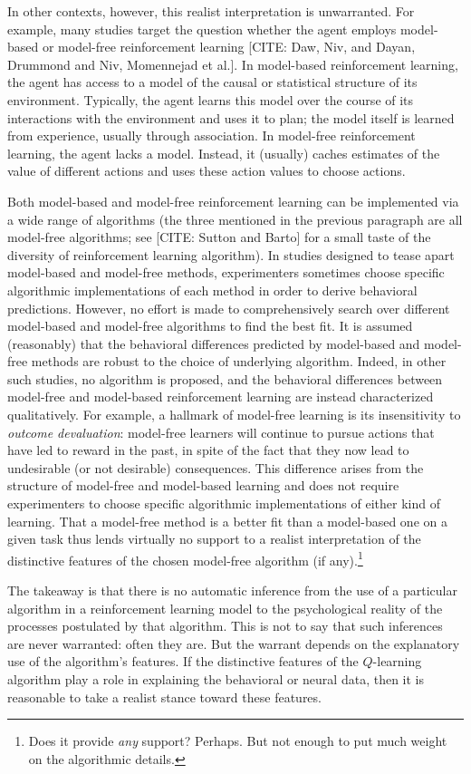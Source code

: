 In other contexts, however, this realist interpretation is unwarranted.
For example, many studies target the question whether the agent employs model-based or model-free reinforcement learning [CITE: Daw, Niv, and Dayan, Drummond and Niv, Momennejad et al.].
In model-based reinforcement learning, the agent has access to a model of the causal or statistical structure of its environment.
Typically, the agent learns this model over the course of its interactions with the environment and uses it to plan; the model itself is learned from experience, usually through association.
In model-free reinforcement learning, the agent lacks a model.
Instead, it (usually) caches estimates of the value of different actions and uses these action values to choose actions.

Both model-based and model-free reinforcement learning can be implemented via a wide range of algorithms (the three mentioned in the previous paragraph are all model-free algorithms; see [CITE: Sutton and Barto] for a small taste of the diversity of reinforcement learning algorithm).
In studies designed to tease apart model-based and model-free methods, experimenters sometimes choose specific algorithmic implementations of each method in order to derive behavioral predictions.
However, no effort is made to comprehensively search over different model-based and model-free algorithms to find the best fit.
It is assumed (reasonably) that the behavioral differences predicted by model-based and model-free methods are robust to the choice of underlying algorithm.
Indeed, in other such studies, no algorithm is proposed, and the behavioral differences between model-free and model-based reinforcement learning are instead characterized qualitatively.
For example, a hallmark of model-free learning is its insensitivity to \emph{outcome devaluation}: model-free learners will continue to pursue actions that have led to reward in the past, in spite of the fact that they now lead to undesirable (or not desirable) consequences.
This difference arises from the structure of model-free and model-based learning and does not require experimenters to choose specific algorithmic implementations of either kind of learning.
That a model-free method is a better fit than a model-based one on a given task thus lends virtually no support to a realist interpretation of the distinctive features of the chosen model-free algorithm (if any).\footnote{Does it provide \emph{any} support? Perhaps. But not enough to put much weight on the algorithmic details.}

The takeaway is that there is no automatic inference from the use of a particular algorithm in a reinforcement learning model to the psychological reality of the processes postulated by that algorithm.
This is not to say that such inferences are never warranted: often they are.
But the warrant depends on the explanatory use of the algorithm's features.
If the distinctive features of the $Q$-learning algorithm play a role in explaining the behavioral or neural data, then it is reasonable to take a realist stance toward these features.


